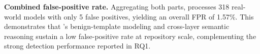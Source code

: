 \noindent \textbf{Combined false-positive rate.} Aggregating both parts, \toolname{} processes 318 real-world models with only 5 false positives, yielding an overall FPR of 1.57\%. This demonstrates that \toolname{}'s benign-template modeling and cross-layer semantic reasoning sustain a low false-positive rate at repository scale, complementing the strong detection performance reported in RQ1.




